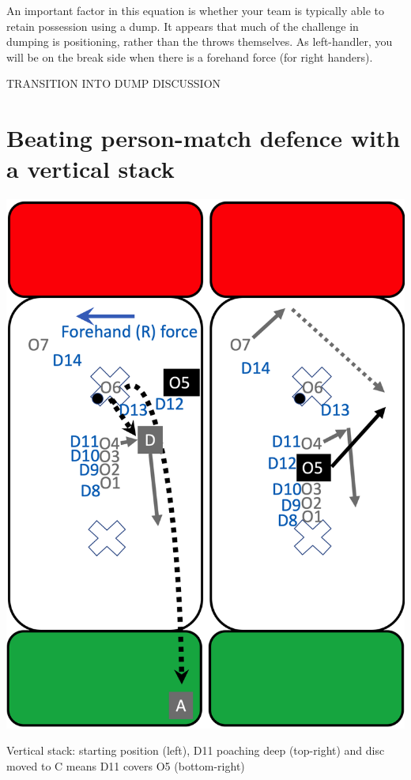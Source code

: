 \documentclass{tufte-handout}
\begin{document}
An important factor 
in this equation 
is whether your team
is typically able to 
retain possession using a dump. 
It appears that 
much of the challenge in dumping 
is positioning, 
rather than the throws themselves. 
As left-handler, 
you will
be on the break side 
when there is 
a forehand force 
(for right handers).  

TRANSITION INTO DUMP DISCUSSION










\section{Beating person-match defence with a vertical stack}\label{sec:vertical}

\begin{marginfigure}%
  \includegraphics[width=\linewidth]{O5-vertical}
  \caption{Vertical stack: 
  starting position (left),
  D11 poaching deep (top-right) 
  and disc moved to C means D11 
  covers O5 (bottom-right)}
  \label{fig:O5-vertical}
\end{marginfigure}
\end{document}
